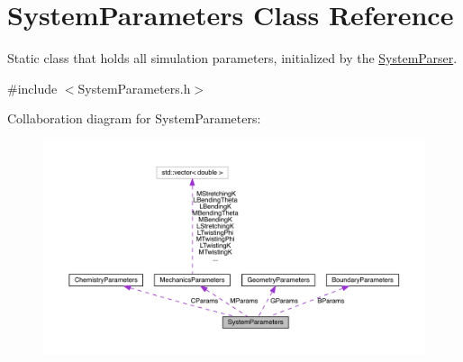 \hypertarget{classSystemParameters}{\section{System\+Parameters Class Reference}
\label{classSystemParameters}
}


Static class that holds all simulation parameters, initialized by the \hyperlink{classSystemParser}{System\+Parser}.  




{\ttfamily \#include $<$System\+Parameters.\+h$>$}



Collaboration diagram for System\+Parameters\+:\nopagebreak
\begin{figure}[H]
\begin{center}
\leavevmode
\includegraphics[width=350pt]{classSystemParameters__coll__graph}
\end{center}
\end{figure}
